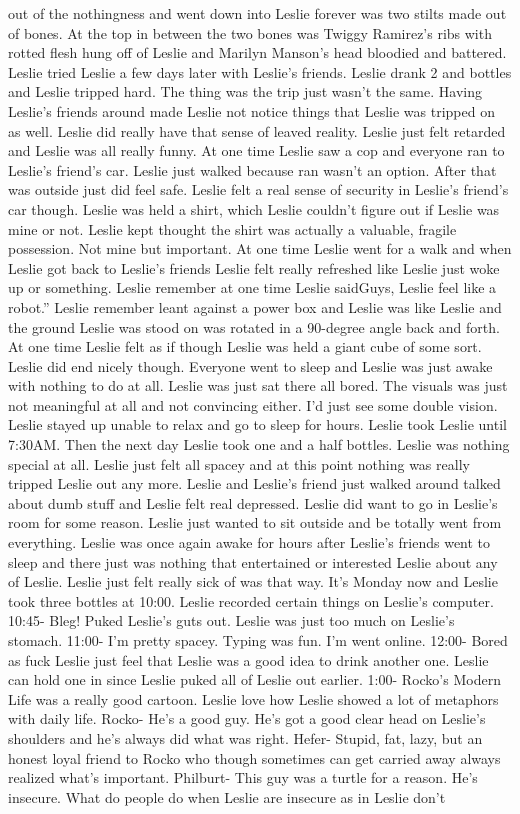 \documentclass[12pt]{book}
\begin{document}
out of the nothingness and went down into Leslie forever was two stilts made out of bones. At the top in between the two bones was Twiggy Ramirez's ribs with rotted flesh hung off of Leslie and Marilyn Manson's head bloodied and battered. Leslie tried Leslie a few days later with Leslie's friends. Leslie drank 2 and  bottles and Leslie tripped hard. The thing was the trip just wasn't the same. Having Leslie's friends around made Leslie not notice things that Leslie was tripped on as well. Leslie did really have that sense of leaved reality. Leslie just felt retarded and Leslie was all really funny. At one time Leslie saw a cop and everyone ran to Leslie's friend's car. Leslie just walked because ran wasn't an option. After that was outside just did feel safe. Leslie felt a real sense of security in Leslie's friend's car though. Leslie was held a shirt, which Leslie couldn't figure out if Leslie was mine or not. Leslie kept thought the shirt was actually a valuable, fragile possession. Not mine but important. At one time Leslie went for a walk and when Leslie got back to Leslie's friends Leslie felt really refreshed like Leslie just woke up or something. Leslie remember at one time Leslie saidGuys, Leslie feel like a robot.'' Leslie remember leant against a power box and Leslie was like Leslie and the ground Leslie was stood on was rotated in a 90-degree angle back and forth. At one time Leslie felt as if though Leslie was held a giant cube of some sort. Leslie did end nicely though. Everyone went to sleep and Leslie was just awake with nothing to do at all. Leslie was just sat there all bored. The visuals was just not meaningful at all and not convincing either. I'd just see some double vision. Leslie stayed up unable to relax and go to sleep for hours. Leslie took Leslie until 7:30AM. Then the next day Leslie took one and a half bottles. Leslie was nothing special at all. Leslie just felt all spacey and at this point nothing was really tripped Leslie out any more. Leslie and Leslie's friend just walked around talked about dumb stuff and Leslie felt real depressed. Leslie did want to go in Leslie's room for some reason. Leslie just wanted to sit outside and be totally went from everything. Leslie was once again awake for hours after Leslie's friends went to sleep and there just was nothing that entertained or interested Leslie about any of Leslie. Leslie just felt really sick of was that way. It's Monday now and Leslie took three bottles at 10:00. Leslie recorded certain things on Leslie's computer. 10:45- Bleg! Puked Leslie's guts out. Leslie was just too much on Leslie's stomach. 11:00- I'm pretty spacey. Typing was fun. I'm went online. 12:00- Bored as fuck Leslie just feel that Leslie was a good idea to drink another one. Leslie can hold one in since Leslie puked all of Leslie out earlier. 1:00- Rocko's Modern Life was a really good cartoon. Leslie love how Leslie showed a lot of metaphors with daily life. Rocko- He's a good guy. He's got a good clear head on Leslie's shoulders and he's always did what was right. Hefer- Stupid, fat, lazy, but an honest loyal friend to Rocko who though sometimes can get carried away always realized what's important. Philburt- This guy was a turtle for a reason. He's insecure. What do people do when Leslie are insecure as in Leslie don't 
\end{document}
